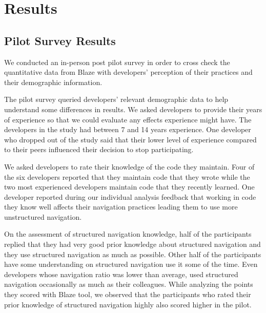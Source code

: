 \documentclass{sig-alternate}
\begin{document}
\section{Results}

\subsection{Pilot Survey Results}

We conducted an in-person post pilot survey in order to cross check the quantitative data from Blaze with developers' perception of their practices and their demographic information.

The pilot survey queried developers' relevant demographic data to help understand some differences in results.  We asked developers to provide their years of experience so that we could evaluate any effects experience might have.  The developers in the study had between 7 and 14 years experience.  One developer who dropped out of the study said that their lower level of experience compared to their peers influenced their decision to stop participating.  

We asked developers to rate their knowledge of the code they maintain.  Four of the six developers reported that they maintain code that they wrote while the two most experienced developers maintain code that they recently learned.  One developer reported during our individual analysis feedback that working in code they know well affects their navigation practices leading them to use more unstructured navigation.

On the assessment of structured navigation knowledge, half of the participants replied that they had very good prior knowledge about structured navigation and they use structured navigation as much as possible.  Other half of the participants have some understanding on structured navigation use it some of the time. Even developers whose navigation ratio  was lower than average, used structured navigation occasionally as much as their colleagues.  While analyzing the points they scored with Blaze tool, we observed that the participants who rated their prior knowledge of structured navigation highly also scored higher in the pilot. 
\end{document}

